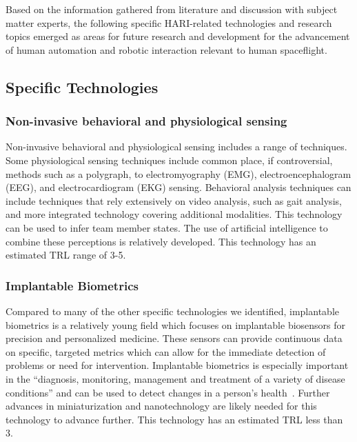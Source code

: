 Based on the information gathered from literature and discussion with subject matter experts, the following specific HARI-related technologies and research topics emerged as areas for future research and development for the advancement of human automation and robotic interaction relevant to human spaceflight.

\subsection{Specific Technologies}
\subsubsection{Non-invasive behavioral and physiological sensing}
Non-invasive behavioral and physiological sensing includes a range of techniques.
Some physiological sensing techniques include common place, if controversial, methods such as a polygraph, to electromyography (EMG), electroencephalogram (EEG), and electrocardiogram (EKG) sensing.
Behavioral analysis techniques can include techniques that rely extensively on video analysis, such as gait analysis, and more integrated technology covering additional modalities.
This technology can be used to infer team member states.
The use of artificial intelligence to combine these perceptions is relatively developed.
This technology has an estimated TRL range of 3-5.

\subsubsection{Implantable Biometrics}
Compared to many of the other specific technologies we identified, implantable biometrics is a relatively young field which focuses on implantable biosensors for precision and personalized medicine.
These sensors can provide continuous data on specific, targeted metrics which can allow for the immediate detection of problems or need for intervention.
Implantable biometrics is especially important in the ``diagnosis, monitoring, management and treatment of a variety of disease conditions'' and can be used to detect changes in a person's health~\citep{fitts_human_1951}.
Further advances in miniaturization and nanotechnology are likely needed for this technology to advance further.
This technology has an estimated TRL less than 3.

